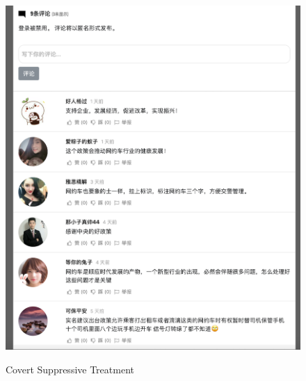 \documentclass[11pt]{article}
\begin{document}
\begin{figure}
  \centering
  \caption{Covert Suppressive Treatment}
  \vspace{1em}
  \includegraphics[width=\textwidth]{figures/covert_subtractive.png}
  \label{covert_subtractive}
\end{figure}
\end{document}
